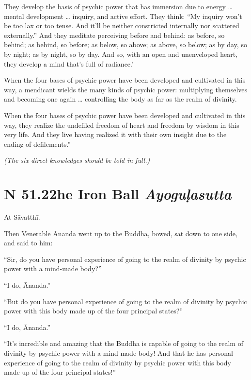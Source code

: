 \documentclass[12pt,openany]{book}%
\newcommand*{\suttatitleacronym}[1]{\smaller[2]{#1}\vspace*{.3em}}
\newcommand*{\suttatitletranslation}[1]{\linebreak{#1}}
\newcommand*{\suttatitleroot}[1]{\linebreak\smaller[2]\itshape{#1}}
\newcommand*{\tocacronym}[1]{\hspace*{-3.3em}{#1}\quad}
\newcommand*{\toctranslation}[1]{#1}
\newcommand*{\tocroot}[1]{(\textit{#1})}
\newcommand*{\scexpansioninstructions}[1]{\begin{small}\textit{#1}\end{small}}
\begin{document}
They develop the basis of psychic power that has immersion due to energy … mental development … inquiry, and active effort. They think: “My inquiry won’t be too lax or too tense. And it’ll be neither constricted internally nor scattered externally.” And they meditate perceiving before and behind: as before, so behind; as behind, so before; as below, so above; as above, so below; as by day, so by night; as by night, so by day. And so, with an open and unenveloped heart, they develop a mind that’s full of radiance.’ 

When the four bases of psychic power have been developed and cultivated in this way, a mendicant wields the many kinds of psychic power: multiplying themselves and becoming one again … controlling the body as far as the realm of divinity. 

When the four bases of psychic power have been developed and cultivated in this way, they realize the undefiled freedom of heart and freedom by wisdom in this very life. And they live having realized it with their own insight due to the ending of defilements.” 

\scexpansioninstructions{(The six direct knowledges should be told in full.) }

%
\section*{{\suttatitleacronym SN 51.22}{\suttatitletranslation The Iron Ball }{\suttatitleroot Ayoguḷasutta}}
\addcontentsline{toc}{section}{\tocacronym{SN 51.22} \toctranslation{The Iron Ball } \tocroot{Ayoguḷasutta}}

At \textsanskrit{Sāvatthī}. 

Then Venerable Ānanda went up to the Buddha, bowed, sat down to one side, and said to him: 

“Sir, do you have personal experience of going to the realm of divinity by psychic power with a mind-made body?” 

“I do, Ānanda.” 

“But do you have personal experience of going to the realm of divinity by psychic power with this body made up of the four principal states?” 

“I do, Ānanda.” 

“It’s incredible and amazing that the Buddha is capable of going to the realm of divinity by psychic power with a mind-made body! And that he has personal experience of going to the realm of divinity by psychic power with this body made up of the four principal states!” 
\end{document}
